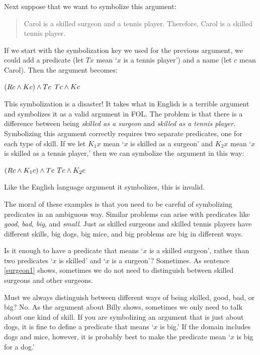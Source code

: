 Next suppose that we want to symbolize this argument:
\begin{quote}
\label{surgeon3}
Carol is a skilled surgeon and a tennis player. Therefore, Carol is a skilled tennis player.
\end{quote}
If we start with the symbolization key we used for the previous argument, we could add a predicate (let $Tx$ mean `$x$ is a tennis player') and a name (let $c$ mean Carol). Then the argument becomes:
\begin{earg}
\prem $(Rc \mathbin{\wedge} Kc) \mathbin{\wedge} Tc$
\conc $Tc \mathbin{\wedge} Kc$
\end{earg}
This symbolization is a disaster! It takes what in English is a terrible argument and symbolizes it as a valid argument in FOL. The problem is that there is a difference between being \emph{skilled as a surgeon} and \emph{skilled as a tennis player}. Symbolizing this argument correctly requires two separate predicates, one for each type of skill. If we let $K_1x$ mean `$x$ is skilled as a surgeon' and $K_2x$ mean `$x$ is skilled as a tennis player,' then we can symbolize the argument in this way:
\begin{earg}
\label{surgeon3correct}
\prem $(Rc \mathbin{\wedge} K_1c) \mathbin{\wedge} Tc$
\conc $Tc \mathbin{\wedge} K_2c$
\end{earg}
Like the English language argument it symbolizes, this is invalid. %

The moral of these examples is that you need to be careful of symbolizing predicates in an ambiguous way. Similar problems can arise with predicates like \emph{good}, \emph{bad}, \emph{big}, and \emph{small}. Just as skilled surgeons and skilled tennis players have different skills, big dogs, big mice, and big problems are big in different ways.

Is it enough to have a predicate that means `$x$ is a skilled surgeon', rather than two predicates `$x$ is skilled' and `$x$ is a surgeon'? Sometimes. As sentence \ref{surgeon1} shows, sometimes we do not need to distinguish between skilled surgeons and other surgeons.

Must we always distinguish between different ways of being skilled, good, bad, or big? No. As the argument about Billy shows, sometimes we only need to talk about one kind of skill. If you are symbolizing an argument that is just about dogs, it is fine to define a predicate that means `$x$ is big.' If the domain includes dogs and mice, however, it is probably best to make the predicate mean `$x$ is big for a dog.'

